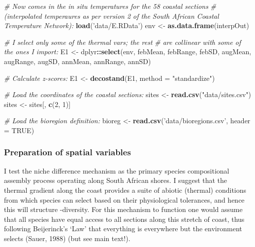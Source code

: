 \documentclass[10pt,A4,]{article}
\newenvironment{Shaded}{\begin{snugshade}}{\end{snugshade}}
\newcommand{\KeywordTok}[1]{\textcolor[rgb]{0.13,0.29,0.53}{\textbf{#1}}}
\newcommand{\DataTypeTok}[1]{\textcolor[rgb]{0.13,0.29,0.53}{#1}}
\newcommand{\DecValTok}[1]{\textcolor[rgb]{0.00,0.00,0.81}{#1}}
\newcommand{\StringTok}[1]{\textcolor[rgb]{0.31,0.60,0.02}{#1}}
\newcommand{\CommentTok}[1]{\textcolor[rgb]{0.56,0.35,0.01}{\textit{#1}}}
\newcommand{\OtherTok}[1]{\textcolor[rgb]{0.56,0.35,0.01}{#1}}
\newcommand{\OperatorTok}[1]{\textcolor[rgb]{0.81,0.36,0.00}{\textbf{#1}}}
\newcommand{\NormalTok}[1]{#1}
\begin{document}
\begin{Shaded}
\begin{Highlighting}[]
\CommentTok{# Now comes in the in situ temperatures for the 58 coastal sections }
\CommentTok{# (interpolated temperaures as per version 2 of the South African Coastal Temperature Network):}
\KeywordTok{load}\NormalTok{(}\StringTok{'data/E.RData'}\NormalTok{)}
\NormalTok{env <-}\StringTok{ }\KeywordTok{as.data.frame}\NormalTok{(interpOut)}

\CommentTok{# I select only some of the thermal vars; the rest}
\CommentTok{# are collinear with some of the ones I import:}
\NormalTok{E1 <-}\StringTok{ }\NormalTok{dplyr}\OperatorTok{::}\KeywordTok{select}\NormalTok{(env, febMean, febRange, febSD, augMean,}
\NormalTok{                    augRange, augSD, annMean, annRange, annSD)}

\CommentTok{# Calculate z-scores:}
\NormalTok{E1 <-}\StringTok{ }\KeywordTok{decostand}\NormalTok{(E1, }\DataTypeTok{method =} \StringTok{"standardize"}\NormalTok{)}

\CommentTok{# Load the coordinates of the coastal sections:}
\NormalTok{sites <-}\StringTok{ }\KeywordTok{read.csv}\NormalTok{(}\StringTok{"data/sites.csv"}\NormalTok{)}
\NormalTok{sites <-}\StringTok{ }\NormalTok{sites[, }\KeywordTok{c}\NormalTok{(}\DecValTok{2}\NormalTok{, }\DecValTok{1}\NormalTok{)]}

\CommentTok{# Load the bioregion definition:}
\NormalTok{bioreg <-}\StringTok{ }\KeywordTok{read.csv}\NormalTok{(}\StringTok{'data/bioregions.csv'}\NormalTok{, }\DataTypeTok{header =} \OtherTok{TRUE}\NormalTok{)}
\end{Highlighting}
\end{Shaded}

\subsubsection*{Preparation of spatial variables}

I test the niche difference mechanism as the primary species
compositional assembly process operating along South African shores. I
suggest that the thermal gradient along the coast provides a suite of
abiotic (thermal) conditions from which species can select based on
their physiological tolerances, and hence this will structure
\textbeta-diversity. For this mechanism to function one would assume
that all species have equal access to all sections along this stretch of
coast, thus following Beijerinck's `Law' that everything is everywhere
but the environment selects (Sauer, 1988) (but see main text!).
\end{document}
